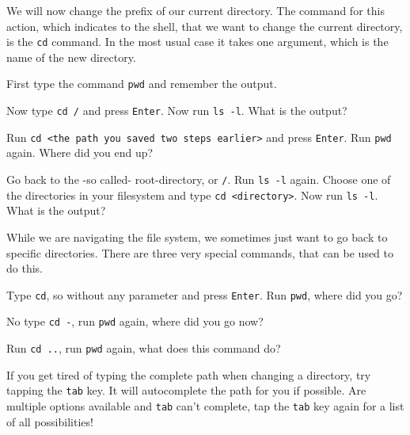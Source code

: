 \begin{challenge}
    \begin{task}
    We will now change the prefix of our current directory.
    The command for this action, which indicates to the shell, that we want to change the current directory, is the \texttt{cd} command.
    In the most usual case it takes one argument, which is the name of the new directory.
        \begin{questions}
            \item First type the command \texttt{pwd} and remember the output. 
            \item Now type \texttt{cd /} and press \texttt{Enter}. Now run \texttt{ls -l}. What is the output?
            \item Run \texttt{cd <the path you saved two steps earlier>} and press \texttt{Enter}. Run \texttt{pwd} again. Where did you end up?
            \item Go back to the -so called- root-directory, or \texttt{/}. Run \texttt{ls -l} again. Choose one of the directories in your filesystem and type \texttt{cd <directory>}. Now run \texttt{ls -l}. What is the output?
        \end{questions}
    \end{task}

    \begin{task}
    While we are navigating the file system, we sometimes just want to go back to specific directories.
    There are three very special commands, that can be used to do this.
        \begin{questions}
            \item Type \texttt{cd}, so without any parameter and press \texttt{Enter}. Run \texttt{pwd}, where did you go?
            \item No type \texttt{cd -}, run \texttt{pwd} again, where did you go now?
            \item Run \texttt{cd ..}, run \texttt{pwd} again, what does this command do?
        \end{questions}
    \end{task}
    \begin{advise}
        If you get tired of typing the complete path when changing a directory, try tapping the \texttt{tab} key.
        It will autocomplete the path for you if possible.
        Are multiple options available and \texttt{tab} can't complete, tap the \texttt{tab} key again for a list of all possibilities!
    \end{advise}
\end{challenge}
    
